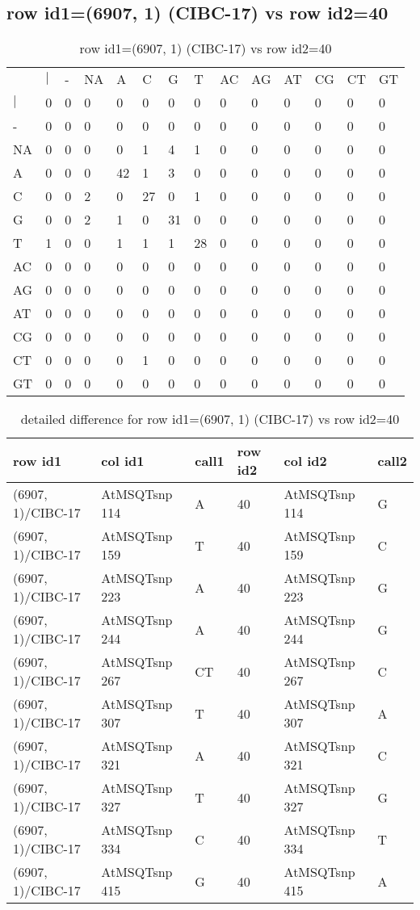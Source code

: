 \subsection{row id1=(6907, 1) (CIBC-17) vs row id2=40}
\begin{center}
\begin{longtable}{|l|l|l|l|l|l|l|l|l|l|l|l|l|l|}
\caption{row id1=(6907, 1) (CIBC-17) vs row id2=40} \label{table_dm80}\\
\hline
\\
\hline
&$|$&-&NA&A&C&G&T&AC&AG&AT&CG&CT&GT\\
$|$&0&0&0&0&0&0&0&0&0&0&0&0&0\\
-&0&0&0&0&0&0&0&0&0&0&0&0&0\\
NA&0&0&0&0&1&4&1&0&0&0&0&0&0\\
A&0&0&0&42&1&3&0&0&0&0&0&0&0\\
C&0&0&2&0&27&0&1&0&0&0&0&0&0\\
G&0&0&2&1&0&31&0&0&0&0&0&0&0\\
T&1&0&0&1&1&1&28&0&0&0&0&0&0\\
AC&0&0&0&0&0&0&0&0&0&0&0&0&0\\
AG&0&0&0&0&0&0&0&0&0&0&0&0&0\\
AT&0&0&0&0&0&0&0&0&0&0&0&0&0\\
CG&0&0&0&0&0&0&0&0&0&0&0&0&0\\
CT&0&0&0&0&1&0&0&0&0&0&0&0&0\\
GT&0&0&0&0&0&0&0&0&0&0&0&0&0\\
\hline
\end{longtable}
\end{center}

\begin{center}
\begin{longtable}{|l|l|l|l|l|l|}
\caption{detailed difference for row id1=(6907, 1) (CIBC-17) vs row id2=40} \label{table_dm81}\\
\hline
row id1&col id1&call1&row id2&col id2&call2\\
\hline
(6907, 1)/CIBC-17&AtMSQTsnp 114&A&40&AtMSQTsnp 114&G\\
(6907, 1)/CIBC-17&AtMSQTsnp 159&T&40&AtMSQTsnp 159&C\\
(6907, 1)/CIBC-17&AtMSQTsnp 223&A&40&AtMSQTsnp 223&G\\
(6907, 1)/CIBC-17&AtMSQTsnp 244&A&40&AtMSQTsnp 244&G\\
(6907, 1)/CIBC-17&AtMSQTsnp 267&CT&40&AtMSQTsnp 267&C\\
(6907, 1)/CIBC-17&AtMSQTsnp 307&T&40&AtMSQTsnp 307&A\\
(6907, 1)/CIBC-17&AtMSQTsnp 321&A&40&AtMSQTsnp 321&C\\
(6907, 1)/CIBC-17&AtMSQTsnp 327&T&40&AtMSQTsnp 327&G\\
(6907, 1)/CIBC-17&AtMSQTsnp 334&C&40&AtMSQTsnp 334&T\\
(6907, 1)/CIBC-17&AtMSQTsnp 415&G&40&AtMSQTsnp 415&A\\
\hline
\end{longtable}
\end{center}

